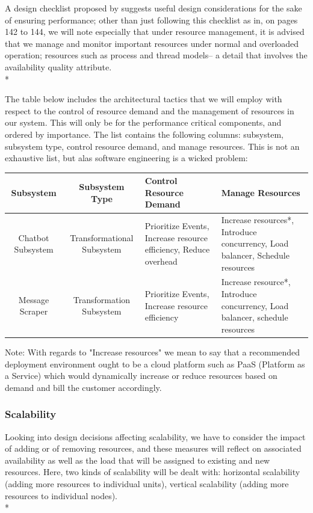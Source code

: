 \documentclass[11pt]{article}
\begin{document}
A design checklist proposed by \cite{Book:2} suggests useful design considerations for the sake of ensuring performance; other than just following this checklist as in, on pages 142 to 144, we will note especially that under resource management, it is advised that we manage and monitor important resources under normal and overloaded operation; resources such as process and thread models-- a detail that involves the availability quality attribute. \\*

The table below includes the architectural tactics that we will employ with respect to the control of resource demand and the management of resources in our system. This will only be for the performance critical components, and ordered by importance. The list contains the following columns: subsystem, subsystem type, control resource demand, and manage resources. This is not an exhaustive list, but alas software engineering is a wicked problem:
\begin{center}
	\begin{tabular}{|c|c|p{5cm}|p{6cm}|}
		\hline
		Subsystem & Subsystem Type & Control Resource Demand & Manage Resources \\
		\hline
		Chatbot Subsystem & Transformational Subsystem & Prioritize Events, Increase resource efficiency, Reduce overhead & Increase resources*, Introduce concurrency, Load balancer, Schedule resources \\
		\hline
		Message Scraper & Transformation Subsystem & Prioritize Events, Increase resource efficiency & Increase resource*, Introduce concurrency, Load balancer, schedule resources \\
		\hline
	\end{tabular}
\end{center}
Note: With regards to "Increase resources" we mean to say that a recommended deployment environment ought to be a cloud platform such as PaaS (Platform as a Service) which would dynamically increase or reduce resources based on demand and bill the customer accordingly.

\subsubsection{Scalability}
Looking into design decisions affecting scalability, we have to consider the impact of adding or of removing resources, and these measures will reflect on associated availability as well as the load that will be assigned to existing and new resources\cite{Book:2}. Here, two kinds of scalability will be dealt with: horizontal scalability (adding more resources to individual units), vertical scalability (adding more resources to individual nodes).\\*
\end{document}
